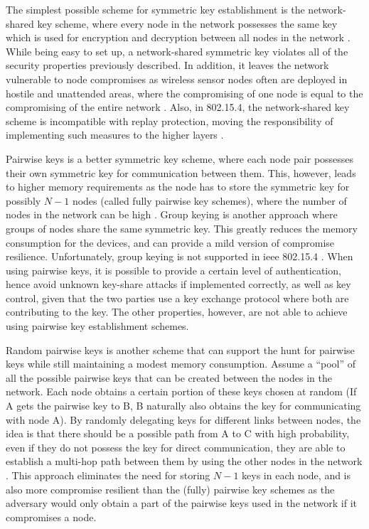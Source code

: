 The simplest possible scheme for symmetric key establishment is the network-shared key scheme, where every node in the network possesses the same key which is used for encryption and decryption between all nodes in the network \cite{perrig2004security}. While being easy to set up, a network-shared symmetric key violates all of the security properties previously described. In addition, it leaves the network vulnerable to node compromises as wireless sensor nodes often are deployed in hostile and unattended areas, where the compromising of one node is equal to the compromising of the entire network \cite{krentz20136lowpan}. Also, in 802.15.4, the network-shared key scheme is incompatible with replay protection, moving the responsibility of implementing such measures to the higher layers \cite{sastry2004security}.



Pairwise keys is a better symmetric key scheme, where each node pair possesses their own symmetric key for communication between them. This, however, leads to higher memory requirements as the node has to store the symmetric key for possibly $N-1$ nodes (called fully pairwise key schemes), where the number of nodes in the network can be high \cite{perrig2004security}. Group keying is another approach where groups of nodes share the same symmetric key. This greatly reduces the memory consumption for the devices, and can provide a mild version of compromise resilience. Unfortunately, group keying is not supported in \gls{ieee} 802.15.4 \cite{sastry2004security}. When using pairwise keys, it is possible to provide a certain level of authentication, hence avoid unknown key-share attacks if implemented correctly, as well as key control, given that the two parties use a key exchange protocol where both are contributing to the key. The other properties, however, are not able to achieve using pairwise key establishment schemes. 

Random pairwise keys is another scheme that can support the hunt for pairwise keys while still maintaining a modest memory consumption. Assume a ``pool'' of all the possible pairwise keys that can be created between the nodes in the network. Each node obtains a certain portion of these keys chosen at random (If A gets the pairwise key to B, B naturally also obtains the key for communicating with node A). By randomly delegating keys for different links between nodes, the idea is that there should be a possible path from A to C with high probability, even if they do not possess the key for direct communication, they are able to establish a multi-hop path between them by using the other nodes in the network \cite{liu2005establishing}. This approach eliminates the need for storing $N-1$ keys in each node, and is also more compromise resilient than the (fully) pairwise key schemes as the adversary would only obtain a part of the pairwise keys used in the network if it compromises a node. 


